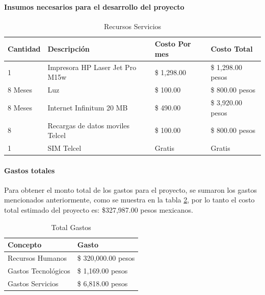 \paragraph{Insumos necesarios para el desarrollo del proyecto} 
\begin{table}[h!]
\begin{tabular}{|p{2cm}|p{4cm}|p{4cm}|p{4cm}|}
\hline
\textbf{Cantidad}& \textbf{Descripción}&\textbf{Costo Por mes}& \textbf{Costo Total}\\
\hline
\hline
1 & Impresora HP Laser Jet Pro M15w & \$ 1,298.00 & \$ 1,298.00  pesos\\
\hline
\hline
8 Meses & Luz & \$ 100.00 & \$ 800.00  pesos\\
\hline
\hline
8 Meses & Internet Infinitum 20 MB & \$ 490.00 & \$ 3,920.00  pesos\\
\hline
\hline
8 & Recargas de datos moviles Telcel & \$ 100.00 & \$ 800.00  pesos\\
\hline
\hline
1 & SIM Telcel & Gratis & Gratis \\
\hline
\end{tabular}
\caption{Recursos Servicios}
\label{disenoEstructura:RecServ}
\end{table}




\newpage
\paragraph{Gastos totales} 
Para obtener el monto total de los gastos para el proyecto, se sumaron los gastos mencionados anteriormente, como se muestra en la tabla \ref{disenoEstructura:TotalGast}, por lo tanto el costo total estimado del proyecto es: \$327,987.00  pesos mexicanos.\\

\begin{table}[h!]
\begin{tabular}{|p{12cm}|p{5cm}|}
\hline
\textbf{Concepto}& \textbf{Gasto}\\
\hline
\hline
Recursos Humanos & \$ 320,000.00 pesos\\
\hline
\hline
Gastos Tecnológicos & \$ 1,169.00 pesos\\ 
\hline
\hline
Gastos Servicios & \$ 6,818.00 pesos \\
\hline
\end{tabular}
\caption{Total Gastos}
\label{disenoEstructura:TotalGast}
\end{table}

